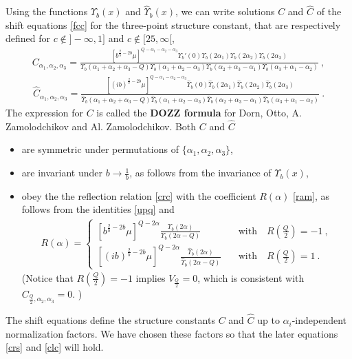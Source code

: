 \documentclass[12pt, a4paper, notitlepage, twoside]{report}
\numberwithin{equation}{section}
\theoremstyle{break}
\begin{document}
Using the functions $\Upsilon_b(x)$ and $\hat\Upsilon_b(x)$, we can write solutions $C$ and $\hat C$ of the shift equations \eqref{fcc} for the three-point structure constant, that are respectively defined for $c\notin ]-\infty, 1]$ and $c\notin [25,\infty[$,
\begin{align}
 \boxed{C_{\alpha_1,\alpha_2,\alpha_3} =  \frac{\left[b^{\frac{2}{b}-2b}\mu\right]^{Q-\alpha_1-\alpha_2-\alpha_3}\Upsilon_b'(0) \Upsilon_b(2\alpha_1) \Upsilon_b(2\alpha_2) \Upsilon_b(2\alpha_3)}{\Upsilon_b(\alpha_1+\alpha_2+\alpha_3-Q) \Upsilon_b(\alpha_1+\alpha_2-\alpha_3)\Upsilon_b(\alpha_2+\alpha_3-\alpha_1)\Upsilon_b(\alpha_3+\alpha_1-\alpha_2)}} \ ,
\label{caaa}
\end{align}
\begin{align}
\boxed{\hat{C}_{\alpha_1,\alpha_2,\alpha_3} =  \frac{\left[(ib)^{\frac{2}{b}-2b}\mu\right]^{Q-\alpha_1-\alpha_2-\alpha_3}\hat{\Upsilon}_b(0) \hat{\Upsilon}_b(2\alpha_1) \hat{\Upsilon}_b(2\alpha_2) \hat{\Upsilon}_b(2\alpha_3)}{\hat{\Upsilon}_b(\alpha_1+\alpha_2+\alpha_3-Q) \hat{\Upsilon}_b(\alpha_1+\alpha_2-\alpha_3)\hat{\Upsilon}_b(\alpha_2+\alpha_3-\alpha_1)\hat{\Upsilon}_b(\alpha_3+\alpha_1-\alpha_2)}} \ .
\label{hc}
\end{align}
The expression for $C$ is called the \textbf{\boldmath DOZZ formula} for Dorn, Otto, A.
Zamolodchikov and Al.
Zamolodchikov. 
Both $C$ and $\hat C$
\begin{itemize}
 \item are symmetric under permutations of $\{\alpha_1,\alpha_2,\alpha_3\}$, 
\item are invariant under $b\to \frac{1}{b}$, as follows from the invariance of $\Upsilon_b(x)$,
\item obey the the reflection relation \eqref{crc} with the coefficient $R(\alpha)$ \eqref{ram}, as follows from the identities \eqref{upq} and 
\begin{align}
 R(\alpha)
=
\left\{\begin{array}{ll}
\left[b^{\frac{2}{b}-2b}\mu\right]^{Q-2\alpha}\frac{\Upsilon_b(2\alpha)}{\Upsilon_b(2\alpha-Q)}
& \quad \text{with} \quad R(\tfrac{Q}{2}) = -1 \ ,
\\
\left[(ib)^{\frac{2}{b}-2b}\mu\right]^{Q-2\alpha}\frac{\hat{\Upsilon}_b(2\alpha)}{\hat{\Upsilon}_b(2\alpha-Q)}
& \quad \text{with} \quad R(\tfrac{Q}{2}) = 1 \ .
\end{array}\right.
\end{align}
(Notice that $R(\frac{Q}{2})=-1$ implies $V_\frac{Q}{2}=0$, which is consistent with $C_{\frac{Q}{2},\alpha_2,\alpha_3}=0$. )
\end{itemize}
The shift equations define the structure constants $C$ and $\hat C$ up to $\alpha_i$-independent normalization factors. 
We have chosen these factors so that the later equations \eqref{crs} and \eqref{clc} will hold.
\end{document}
